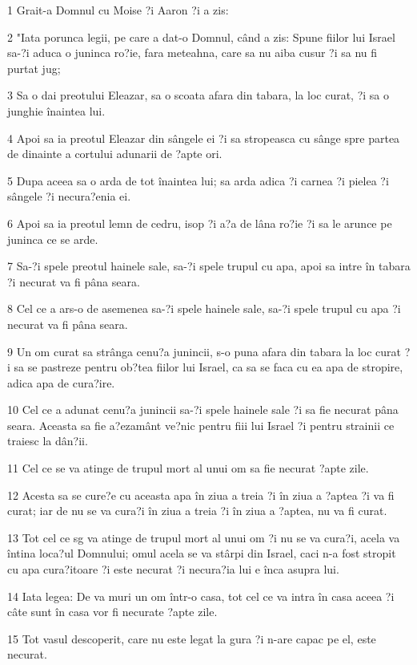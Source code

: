 \par 1 Grait-a Domnul cu Moise ?i Aaron ?i a zis:
\par 2 "Iata porunca legii, pe care a dat-o Domnul, când a zis: Spune fiilor lui Israel sa-?i aduca o juninca ro?ie, fara meteahna, care sa nu aiba cusur ?i sa nu fi purtat jug;
\par 3 Sa o dai preotului Eleazar, sa o scoata afara din tabara, la loc curat, ?i sa o junghie înaintea lui.
\par 4 Apoi sa ia preotul Eleazar din sângele ei ?i sa stropeasca cu sânge spre partea de dinainte a cortului adunarii de ?apte ori.
\par 5 Dupa aceea sa o arda de tot înaintea lui; sa arda adica ?i carnea ?i pielea ?i sângele ?i necura?enia ei.
\par 6 Apoi sa ia preotul lemn de cedru, isop ?i a?a de lâna ro?ie ?i sa le arunce pe juninca ce se arde.
\par 7 Sa-?i spele preotul hainele sale, sa-?i spele trupul cu apa, apoi sa intre în tabara ?i necurat va fi pâna seara.
\par 8 Cel ce a ars-o de asemenea sa-?i spele hainele sale, sa-?i spele trupul cu apa ?i necurat va fi pâna seara.
\par 9 Un om curat sa strânga cenu?a junincii, s-o puna afara din tabara la loc curat ?i sa se pastreze pentru ob?tea fiilor lui Israel, ca sa se faca cu ea apa de stropire, adica apa de cura?ire.
\par 10 Cel ce a adunat cenu?a junincii sa-?i spele hainele sale ?i sa fie necurat pâna seara. Aceasta sa fie a?ezamânt ve?nic pentru fiii lui Israel ?i pentru strainii ce traiesc la dân?ii.
\par 11 Cel ce se va atinge de trupul mort al unui om sa fie necurat ?apte zile.
\par 12 Acesta sa se cure?e cu aceasta apa în ziua a treia ?i în ziua a ?aptea ?i va fi curat; iar de nu se va cura?i în ziua a treia ?i în ziua a ?aptea, nu va fi curat.
\par 13 Tot cel ce sg va atinge de trupul mort al unui om ?i nu se va cura?i, acela va întina loca?ul Domnului; omul acela se va stârpi din Israel, caci n-a fost stropit cu apa cura?itoare ?i este necurat ?i necura?ia lui e înca asupra lui.
\par 14 Iata legea: De va muri un om într-o casa, tot cel ce va intra în casa aceea ?i câte sunt în casa vor fi necurate ?apte zile.
\par 15 Tot vasul descoperit, care nu este legat la gura ?i n-are capac pe el, este necurat.
